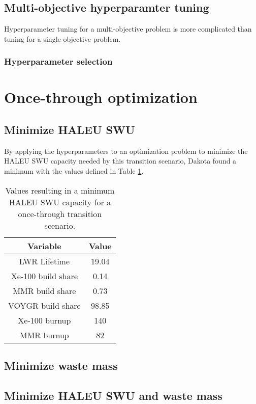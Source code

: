\subsection{Multi-objective hyperparamter tuning}
Hyperparameter tuning for a multi-objective problem is more complicated 
than tuning for a single-objective problem. 

\subsubsection{Hyperparameter selection}

\section{Once-through optimization}
\subsection{Minimize HALEU SWU}
By applying the hyperparameters to an optimization problem to minimize the 
\gls{HALEU} \gls{SWU} capacity needed by this transition scenario, Dakota
found a minimum with the values defined in Table \ref{tab:soga_ot_haleu}.

\begin{table}
    \centering 
    \caption{Values resulting in a minimum \gls{HALEU} \gls{SWU} capacity for 
              a once-through transition scenario.}
    \label{tab:soga_ot_haleu}
    \begin{tabular}{c c}
        \hline
        Variable & Value \\
        \hline
        LWR Lifetime & 19.04\\
        Xe-100 build share & 0.14\\
        MMR build share & 0.73\\
        VOYGR build share & 98.85\\
        Xe-100 burnup & 140\\
        MMR burnup & 82\\
        \hline
    \end{tabular}
\end{table}

\subsection{Minimize waste mass}

\subsection{Minimize HALEU SWU and waste mass}

